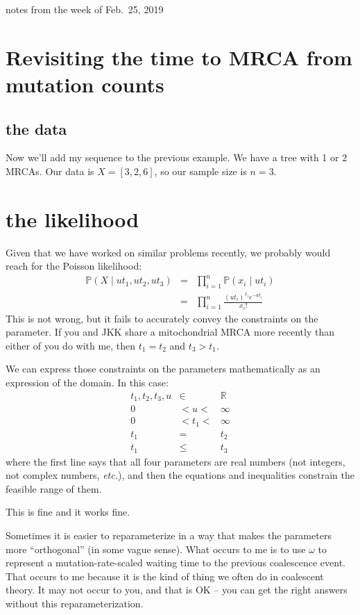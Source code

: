 \documentclass[11pt]{article}
\renewcommand{\Pr}{\mathbb{P}}
\begin{document}
notes from the week of Feb.~25, 2019 \\
\tableofcontents


\section{Revisiting the time to MRCA from mutation counts}
\subsection{the data}
Now we'll add my sequence to the previous example.
We have a tree with 1 or 2 MRCAs.
Our data is
$X=[3,2,6]$,
so our sample size is $n=3$.

\section{the likelihood}\label{M1model}
Given that we have worked on similar problems recently, we probably would reach
for the Poisson likelihood:
\begin{eqnarray}
\Pr(X\mid ut_1, ut_2, ut_3)& = & \prod_{i=1}^{n} \Pr(x_i\mid ut_i)\\
& = & \prod_{i=1}^{n} \frac{(ut_i)^{x_i}e^{-ut_i}}{x_i ! }
\end{eqnarray}
This is not wrong, but it fails to accurately convey the constraints on the parameter.
If you and JKK share a mitochondrial MRCA more recently than either of you do with me, then $t_1=t_2$ and $t_3> t_1$.

We can express those constraints on the parameters mathematically as an expression of the domain.
In this case: 
\begin{eqnarray}
    t_1, t_2, t_3, u & \in &  \mathbb{R}\\
    0 & < u < & \infty\\
    0 & < t_1 < & \infty\\
    t_1 & = & t_2 \\
    t_1 & \leq & t_3
\end{eqnarray}
where the first line says that all four parameters are real numbers (not integers, 
not complex numbers, {\em etc.}), and then the equations and inequalities constrain
the feasible range of them.

This is fine and it works fine.

Sometimes it is easier to reparameterize in a way that makes the parameters more
``orthogonal'' (in some vague sense).
What occurs to me is to use $\omega$ to represent a mutation-rate-scaled waiting
time to the previous coalescence event.
That occurs to me because it is the kind of thing we often do in coalescent theory.
It may not occur to you, and that is OK -- you can get the right answers without
this reparameterization.
\end{document}
